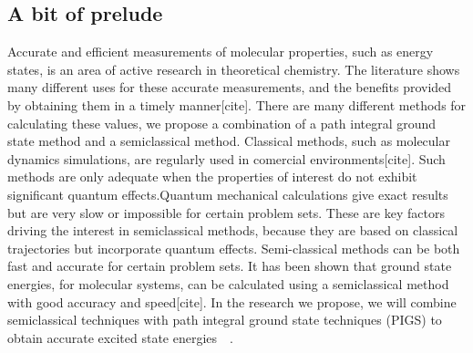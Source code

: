 \documentclass[12pt,letterpaper,oneside,final,titlepage]{article}               %
\numberwithin{equation}{section} %
\begin{document}
\subsection{A bit of prelude}
Accurate and efficient measurements of molecular properties, such as energy states, is an area of active research in theoretical chemistry. The literature shows many different uses for these accurate measurements, and the benefits provided by obtaining them in a timely manner[cite]. There are many different methods for calculating these values, we propose a combination of a path integral ground state method and a semiclassical method. Classical methods, such as molecular dynamics simulations, are regularly used in comercial environments[cite]. Such methods are only adequate when the properties of interest do not exhibit significant quantum effects.Quantum mechanical calculations give exact results but are very slow or impossible for certain problem sets. These are key factors driving the interest in semiclassical methods, because they are based on classical trajectories but incorporate quantum effects. Semi-classical methods can be both fast and accurate for certain problem sets. It has been shown that ground state energies, for molecular systems, can be calculated using a semiclassical method with good accuracy and speed[cite]. In the research we propose, we will combine semiclassical techniques with path integral ground state techniques (PIGS) to obtain accurate excited state energies~\cite{issack2007semiclassical}~\cite{schmidt2014inclusion}.
\end{document}
